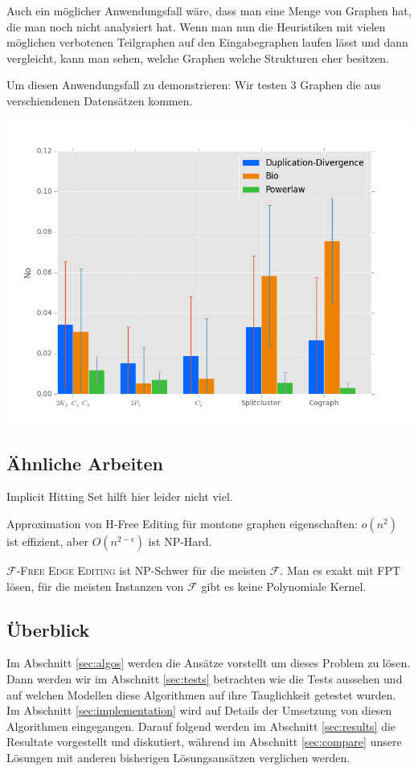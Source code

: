 \documentclass[12pt,a4paper,onecolumn,oneside,titlepage]{article}
\newcommand\cursive[1]{\ensuremath{\mathcal{#1}}}
\begin{document}
Auch ein möglicher Anwendungsfall wäre, dass man eine Menge von Graphen hat, die man noch nicht analysiert hat. Wenn man nun die Heuristiken mit vielen möglichen verbotenen Teilgraphen auf den Eingabegraphen laufen lässt und dann vergleicht, kann man sehen, welche Graphen welche Strukturen eher besitzen.

Um diesen Anwendungsfall zu demonstrieren: Wir testen 3 Graphen die aus verschiendenen Datensätzen kommen.

\includegraphics[scale=0.7]{plots/best.png} 



\subsection{Ähnliche Arbeiten}
Implicit Hitting Set hilft hier leider nicht viel.\cite{Moreno13} 

Approximation von H-Free Editing für montone graphen eigenschaften: $o(n^2)$ ist effizient, aber $O(n^{2-\epsilon})$ ist NP-Hard.\cite{Alon09}

\textsc{\cursive{F}-Free Edge Editing} ist NP-Schwer für die meisten \cursive{F}. Man es exakt mit FPT lösen\cite{Cai96}, für die meisten Instanzen von \cursive{F} gibt es keine Polynomiale Kernel.


\subsection{Überblick}
Im Abschnitt \ref{sec:algos} werden die Ansätze vorstellt um dieses Problem zu lösen. Dann werden wir im Abschnitt \ref{sec:tests} betrachten wie die Tests aussehen und auf welchen Modellen diese Algorithmen auf ihre Tauglichkeit getestet wurden. Im Abschnitt \ref{sec:implementation} wird auf Details der Umsetzung von diesen Algorithmen eingegangen. Darauf folgend werden im Abschnitt \ref{sec:results} die Resultate vorgestellt und diskutiert, während im Abschnitt \ref{sec:compare} unsere Lösungen mit anderen bisherigen Lösungsansätzen verglichen werden.
\end{document}
